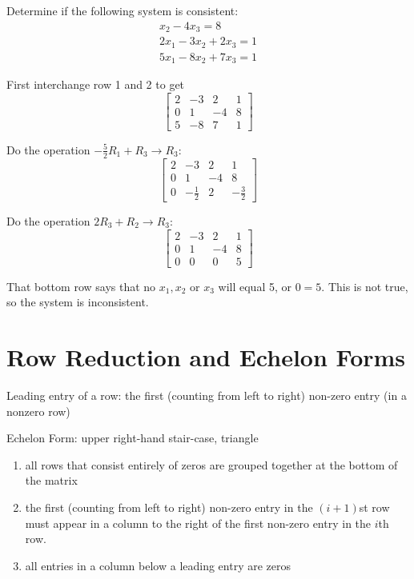\documentclass[../linalg.tex]{subfiles}
\begin{document}
\begin{example}
    Determine if the following system is consistent:
    \begin{align*}
        x_2-4x_3=8\\
        2x_1-3x_2+2x_3=1\\
        5x_1-8x_2+7x_3=1
    \end{align*}

    First interchange row 1 and 2 to get \[\begin{bmatrix}
        2 & -3 & 2 & 1\\
        0 & 1 & -4 & 8\\
        5 & -8 & 7 & 1
    \end{bmatrix}\]

    Do the operation $-\frac{5}{2}R_1+R_3\rightarrow R_3$:
    \[\begin{bmatrix}
        2 & -3 & 2 & 1\\
        0 & 1 & -4 & 8\\
        0 & -\frac{1}{2} & 2 & -\frac{3}{2}
    \end{bmatrix}\] 

    Do the operation $2R_3+R_2\rightarrow R_3$:
    \[\begin{bmatrix}
        2 & -3 & 2 & 1\\
        0 & 1 & -4 & 8\\
        0 & 0 & 0 & 5
    \end{bmatrix}\]

    That bottom row says that no $x_1,x_2$ or $x_3$ will equal 5, or $0=5$. This is not true, so the system is inconsistent.
\end{example}

\section{Row Reduction and Echelon Forms}
Leading entry of a row: the first (counting from left to right) non-zero entry (in a nonzero row)

Echelon Form: upper right-hand stair-case, triangle 
\begin{enumerate}
    \item all rows that consist entirely of zeros are grouped together at the bottom of the matrix 
    \item the first (counting from left to right) non-zero entry in the $(i+1)$st row must appear in a column to the right of the first non-zero entry in the $i$th row.
    \item all entries in a column below a leading entry are zeros 
\end{enumerate}
\end{document}
